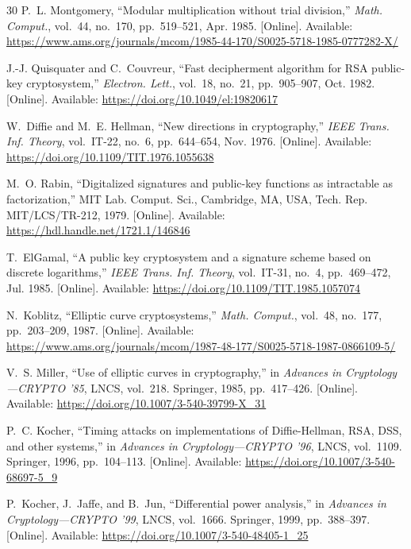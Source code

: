 \documentclass[journal]{IEEEtran}
\begin{document}
\begin{thebibliography}{30}
P.~L. Montgomery, ``Modular multiplication without trial division,'' \textit{Math. Comput.}, vol.~44, no.~170, pp.~519--521, Apr. 1985. [Online]. Available: \url{https://www.ams.org/journals/mcom/1985-44-170/S0025-5718-1985-0777282-X/}

J.-J. Quisquater and C.~Couvreur, ``Fast decipherment algorithm for RSA public-key cryptosystem,'' \textit{Electron. Lett.}, vol.~18, no.~21, pp.~905--907, Oct. 1982. [Online]. Available: \url{https://doi.org/10.1049/el:19820617}

W.~Diffie and M.~E. Hellman, ``New directions in cryptography,'' \textit{IEEE Trans. Inf. Theory}, vol.~IT-22, no.~6, pp.~644--654, Nov. 1976. [Online]. Available: \url{https://doi.org/10.1109/TIT.1976.1055638}

M.~O. Rabin, ``Digitalized signatures and public-key functions as intractable as factorization,'' MIT Lab. Comput. Sci., Cambridge, MA, USA, Tech. Rep. MIT/LCS/TR-212, 1979. [Online]. Available: \url{https://hdl.handle.net/1721.1/146846}

T.~ElGamal, ``A public key cryptosystem and a signature scheme based on discrete logarithms,'' \textit{IEEE Trans. Inf. Theory}, vol.~IT-31, no.~4, pp.~469--472, Jul. 1985. [Online]. Available: \url{https://doi.org/10.1109/TIT.1985.1057074}

N.~Koblitz, ``Elliptic curve cryptosystems,'' \textit{Math. Comput.}, vol.~48, no.~177, pp.~203--209, 1987. [Online]. Available: \url{https://www.ams.org/journals/mcom/1987-48-177/S0025-5718-1987-0866109-5/}

V.~S. Miller, ``Use of elliptic curves in cryptography,'' in \textit{Advances in Cryptology---CRYPTO '85}, LNCS, vol.~218. Springer, 1985, pp.~417--426. [Online]. Available: \url{https://doi.org/10.1007/3-540-39799-X_31}

P.~C. Kocher, ``Timing attacks on implementations of Diffie-Hellman, RSA, DSS, and other systems,'' in \textit{Advances in Cryptology---CRYPTO '96}, LNCS, vol.~1109. Springer, 1996, pp.~104--113. [Online]. Available: \url{https://doi.org/10.1007/3-540-68697-5_9}

P.~Kocher, J.~Jaffe, and B.~Jun, ``Differential power analysis,'' in \textit{Advances in Cryptology---CRYPTO '99}, LNCS, vol.~1666. Springer, 1999, pp.~388--397. [Online]. Available: \url{https://doi.org/10.1007/3-540-48405-1_25}


\end{thebibliography}
\end{document}
